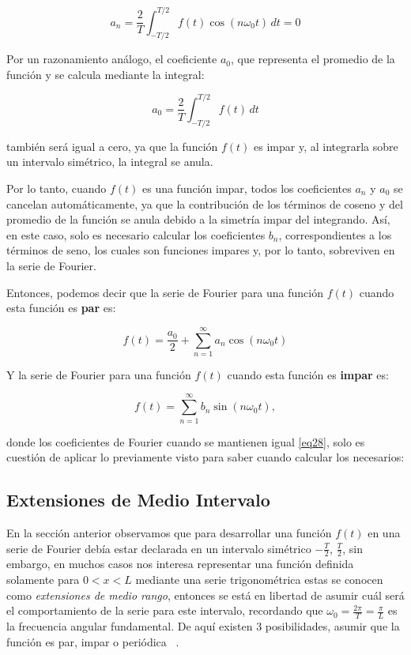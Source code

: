 \[
a_n = \frac{2}{T} \int_{-T/2}^{T/2} f(t) \cos(n \omega_0 t) \, dt = 0
\]

Por un razonamiento análogo, el coeficiente \( a_0 \), que representa el promedio de la función y se calcula mediante la integral:

\[
a_0 = \frac{2}{T} \int_{-T/2}^{T/2} f(t) \, dt
\]

también será igual a cero, ya que la función \( f(t) \) es impar y, al integrarla sobre un intervalo simétrico, la integral se anula.

Por lo tanto, cuando \( f(t) \) es una función impar, todos los coeficientes \( a_n \) y \( a_0 \) se cancelan automáticamente, ya que la contribución de los términos de coseno y del promedio de la función se anula debido a la simetría impar del integrando. Así, en este caso, solo es necesario calcular los coeficientes \( b_n \), correspondientes a los términos de seno, los cuales son funciones impares y, por lo tanto, sobreviven en la serie de Fourier. \newline

Entonces, podemos decir que la serie de Fourier para una función $f(t)$ cuando esta función es \textbf{par} es:

\begin{equation}\label{eq30}
	f(t) = \frac{a_0}{2} + \sum_{n=1}^{\infty} a_n \cos(n\omega_0 t)
\end{equation}

Y la serie de Fourier para una función $f(t)$ cuando esta función es \textbf{impar} es:

\begin{equation}\label{eq31}
	f(t) =\sum_{n=1}^{\infty}  b_n \sin(n\omega_0 t),
\end{equation}

donde los coeficientes de Fourier cuando se mantienen igual \ref{eq28}, solo es cuestión de aplicar lo previamente visto para saber cuando calcular los necesarios:


\subsection{Extensiones de Medio Intervalo}
En la sección anterior observamos que para desarrollar una función $f(t)$ en una serie de Fourier debía estar declarada en un intervalo simétrico $-\frac{T}{2}$, $\frac{T}{2}$, sin embargo, en muchos casos nos interesa representar una función definida solamente para $0 < x < L$ mediante una serie trigonométrica estas se conocen como \textit{extensiones de medio rango}, entonces se está en libertad de asumir cuál será el comportamiento de la serie para este intervalo, recordando que  $\omega_0 = \frac{2\pi}{T} = \frac{\pi}{L}$ es la frecuencia angular fundamental. De aquí existen 3 posibilidades, asumir que la función es par, impar o periódica ~\cite{fourierCruzFierro}. 

